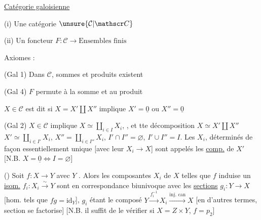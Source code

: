 \uline{Catégorie galoisienne}

(i) Une catégorie $\unsure{\mathcal C|\mathscr C}$

(ii) Un foncteur $F:\mathcal C\to\text{Ensembles finis}$

Axiomes :


(Gal 1) Dans $\mathcal C$,  sommes et  produits   existent


(Gal 4) $F$ permute à la somme et au produit


$X\in\mathcal C$ est dit   si $X=X'\amalg X''$ implique $X'=\underline{0}$
ou $X''=\underline{0}$

(Gal 2) $X\in\mathcal C$  implique $X\simeq\coprod_{i\in I}X_i$, , et tte décomposition
$X\simeq X'\amalg X''$  $X'\simeq\coprod_{i\in I'}X_i$, $X''=\coprod_{i\in I''}X_i$,
$I'\cap I''=\varnothing$, $I'\cup I''=I$. Les $X_i$, déterminés de
façon essentiellement unique [avec leur $X_i\to X$]
sont appelés les \uline{comp.}   de $X'$ [N.B. $X=\underline{0}\Leftrightarrow I=\varnothing$]

() Soit $f:X\to Y$ avec $Y$  . Alors les
composantes  $X_i$ de $X$ telles que $f$ induise
un \uline{isom.} $f_i:X_i\xrightarrow{\sim}Y$ sont en correspondance
biunivoque avec les \uline{sections} $g_i:Y\to X$ 
[hom. tels que $fg=\mathrm{id}_Y$], $g_i$ étant le composé
 $Y\xrightarrow{f_i^{-1}}X_i\xrightarrow{\text{inj. can}}X$ [en d'autres termes,
 section se factorise] [N.B. il suffit
de le vérifier si $X=Z\times Y$, $f=p_2$]

